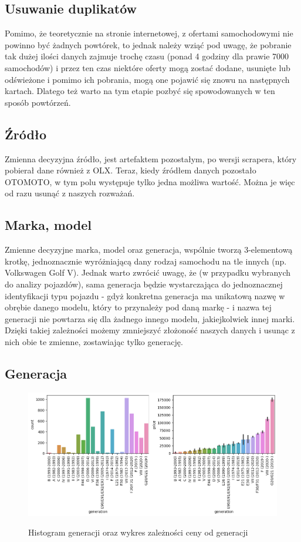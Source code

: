 \documentclass{article}
\begin{document}
\subsection{Usuwanie duplikatów}
Pomimo, że teoretycznie na stronie internetowej, z ofertami samochodowymi nie powinno być żadnych powtórek, to jednak należy wziąć pod uwagę, że pobranie tak dużej ilości danych zajmuje trochę czasu (ponad 4 godziny dla prawie 7000 samochodów) i przez ten czas niektóre oferty mogą zostać dodane, usunięte lub odświeżone i pomimo ich pobrania, mogą one pojawić się znowu na następnych kartach. Dlatego też warto na tym etapie pozbyć się spowodowanych w ten sposób powtórzeń.

\subsection{Źródło}
Zmienna decyzyjna źródło, jest artefaktem pozostałym, po wersji scrapera, który pobierał dane również z OLX. Teraz, kiedy źródłem danych pozostało OTOMOTO, w tym polu występuje tylko jedna możliwa wartość. Można je więc od razu usunąć z naszych rozważań.

\subsection{Marka, model}
Zmienne decyzyjne marka, model oraz generacja, wspólnie tworzą 3-elementową krotkę, jednoznacznie wyróżniającą dany rodzaj samochodu na tle innych (np. Volkswagen Golf V). Jednak warto zwrócić uwagę, że (w przypadku wybranych do analizy pojazdów), sama generacja będzie wystarczająca do jednoznacznej identyfikacji typu pojazdu - gdyż konkretna generacja ma unikatową nazwę w obrębie danego modelu, który to przynależy pod daną markę - i nazwa tej generacji nie powtarza się dla żadnego innego modelu, jakiejkolwiek innej marki. Dzięki takiej zależności możemy zmniejszyć złożoność naszych danych i usunąc z nich obie te zmienne, zostawiając tylko generację. 

\subsection{Generacja}
\begin{figure}[H]
    \centering
    \includegraphics[width=1\linewidth]{images/generacja.png}
    \label{plt:generation}
    \caption{Histogram generacji oraz wykres zależności ceny od generacji}
\end{figure}
\end{document}
